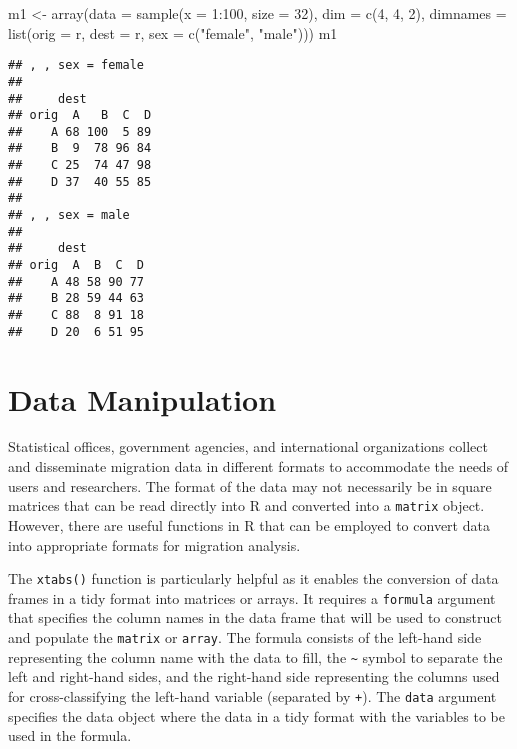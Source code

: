 \documentclass[
]{book}
\newenvironment{Shaded}{\begin{snugshade}}{\end{snugshade}}
\newcommand{\AttributeTok}[1]{\textcolor[rgb]{0.77,0.63,0.00}{#1}}
\newcommand{\DecValTok}[1]{\textcolor[rgb]{0.00,0.00,0.81}{#1}}
\newcommand{\FunctionTok}[1]{\textcolor[rgb]{0.00,0.00,0.00}{#1}}
\newcommand{\NormalTok}[1]{#1}
\newcommand{\OtherTok}[1]{\textcolor[rgb]{0.56,0.35,0.01}{#1}}
\newcommand{\SpecialCharTok}[1]{\textcolor[rgb]{0.00,0.00,0.00}{#1}}
\newcommand{\StringTok}[1]{\textcolor[rgb]{0.31,0.60,0.02}{#1}}
\begin{document}
\begin{Shaded}
\begin{Highlighting}[]
\NormalTok{m1 }\OtherTok{\textless{}{-}} \FunctionTok{array}\NormalTok{(}\AttributeTok{data =} \FunctionTok{sample}\NormalTok{(}\AttributeTok{x =} \DecValTok{1}\SpecialCharTok{:}\DecValTok{100}\NormalTok{, }\AttributeTok{size =} \DecValTok{32}\NormalTok{),}
            \AttributeTok{dim =} \FunctionTok{c}\NormalTok{(}\DecValTok{4}\NormalTok{, }\DecValTok{4}\NormalTok{, }\DecValTok{2}\NormalTok{),}
            \AttributeTok{dimnames =} \FunctionTok{list}\NormalTok{(}\AttributeTok{orig =}\NormalTok{ r, }\AttributeTok{dest =}\NormalTok{ r, }\AttributeTok{sex =} \FunctionTok{c}\NormalTok{(}\StringTok{"female"}\NormalTok{, }\StringTok{"male"}\NormalTok{)))}
\NormalTok{m1}
\end{Highlighting}
\end{Shaded}

\begin{verbatim}
## , , sex = female
## 
##     dest
## orig  A   B  C  D
##    A 68 100  5 89
##    B  9  78 96 84
##    C 25  74 47 98
##    D 37  40 55 85
## 
## , , sex = male
## 
##     dest
## orig  A  B  C  D
##    A 48 58 90 77
##    B 28 59 44 63
##    C 88  8 91 18
##    D 20  6 51 95
\end{verbatim}

\hypertarget{data-manipulation}{%
\section{Data Manipulation}\label{data-manipulation}}

Statistical offices, government agencies, and international organizations collect and disseminate migration data in different formats to accommodate the needs of users and researchers. The format of the data may not necessarily be in square matrices that can be read directly into R and converted into a \texttt{matrix} object. However, there are useful functions in R that can be employed to convert data into appropriate formats for migration analysis.

The \texttt{xtabs()} function is particularly helpful as it enables the conversion of data frames in a tidy format \citet{Wickham2014} into matrices or arrays. It requires a \texttt{formula} argument that specifies the column names in the data frame that will be used to construct and populate the \texttt{matrix} or \texttt{array}. The formula consists of the left-hand side representing the column name with the data to fill, the \texttt{\textasciitilde{}} symbol to separate the left and right-hand sides, and the right-hand side representing the columns used for cross-classifying the left-hand variable (separated by \texttt{+}). The \texttt{data} argument specifies the data object where the data in a tidy format with the variables to be used in the formula.
\end{document}
